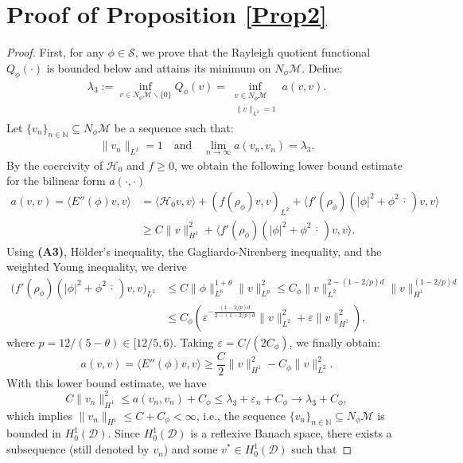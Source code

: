 \documentclass[preprint,3p]{elsarticle}
\begin{document}
\section{Proof of {\bf Proposition }  \ref{Prop2}}\label{Appendix_Pro1}
\begin{proof}
	First, for any $\phi\in\mathcal{S}$, we prove that the Rayleigh quotient functional $Q_\phi(\cdot)$ is bounded below and attains its minimum on $N_\phi\mathcal{M}$. Define:
	\begin{align*}
		\lambda_3 := \inf_{v \in N_{\phi}\mathcal{M}\backslash\{0\}} Q_{\phi}(v) = \inf_{\substack{v \in N_{\phi}\mathcal{M} \\ \|v\|_{L^2} = 1}} a(v,v).
	\end{align*}
	Let {$\{v_n\}_{n\in\mathbb{N}}\subseteq N_{\phi}\mathcal{M}$} be a sequence such that:
	\begin{align*}
		\|v_n\|_{L^2} = 1\quad\text{and}\quad\lim\limits_{n\to\infty}a(v_n, v_n)=\lambda_3.
	\end{align*}
	By the coercivity of $\mathcal{H}_0$ and $f\ge0$, we obtain the following lower bound estimate for the bilinear form $a(\cdot,\cdot)$
	\begin{align*}
		a(v,v) = \langle E''(\phi)v, v \rangle 
		&= \langle \mathcal{H}_0 v, v \rangle + (f(\rho_\phi)v, v)_{L^2} + \big\langle f'(\rho_\phi)(|\phi|^2 + \phi^2 \overline{\,\cdot\,})v, v\big\rangle \\
		&\ge C\|v\|_{H^1}^2 + \big\langle f'(\rho_\phi)(|\phi|^2 + \phi^2 \overline{\,\cdot\,})v, v\big\rangle.
	\end{align*}
	Using {\bf (A3)}, H\"older's inequality, the Gagliardo-Nirenberg inequality, and the weighted Young inequality, we derive
	\begin{align}\label{Positive1}
		\nonumber \big(f'(\rho_\phi)(|\phi|^2 + \phi^2 \overline{\,\cdot\,})v, v\big)_{L^2} 
		&\le C\|\phi\|_{L^6}^{1+\theta} \|v\|_{L^p}^2 
		\le C_\phi \|v\|_{L^2}^{2-(1-2/p)d} \|v\|_{H^1}^{(1-2/p)d} \\
		&\le C_\phi \left( \varepsilon^{-\frac{(1-2/p)d}{2-(1-2/p)d}} \|v\|_{L^2}^2 + \varepsilon \|v\|_{H^1}^2 \right),
	\end{align}
	where $p = 12/(5 - \theta) \in [12/5, 6)$. Taking $\varepsilon = C/(2C_\phi)$, we finally obtain:
	$$
	a(v, v) = \langle E''(\phi)v, v \rangle \ge \frac{C}{2} \|v\|_{H^1}^2 - C_\phi \|v\|_{L^2}^2.
	$$
	With this lower bound estimate, we have
	$$
	C \|v_n\|_{H^1}^2 \leq a(v_n, v_n) + C_\phi \leq \lambda_3 + \varepsilon_n + C_\phi \to \lambda_3 + C_\phi,
	$$
	which implies $\|v_n\|_{H^1} \leq C + C_\phi < \infty$, i.e., the sequence {$\{v_n\}_{n\in\mathbb{N}}\subseteq N_{\phi}\mathcal{M}$} is bounded in $H_0^1(\mathcal{D})$. Since $H_0^1(\mathcal{D})$ is a reflexive Banach space, there exists a subsequence (still denoted by $v_n$) and some $v^* \in H_0^1(\mathcal{D})$ such that

\end{proof}
\end{document}
